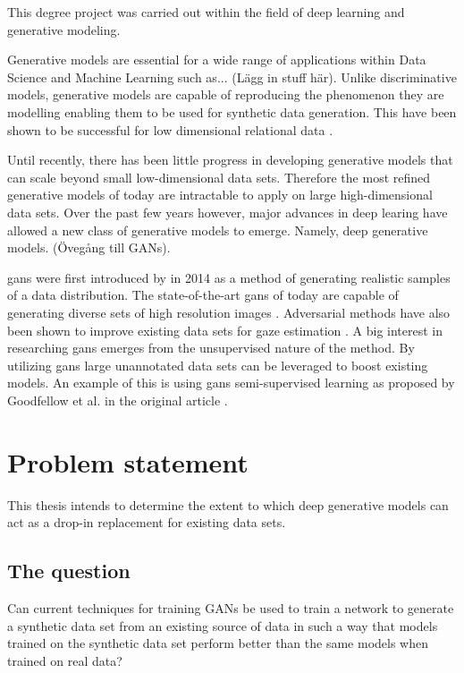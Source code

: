
This degree project was carried out within the field of deep learning and generative modeling.

Generative models are essential for a wide range of applications within Data Science and Machine Learning such as... (Lägg in stuff här). Unlike discriminative models, generative models are capable of reproducing the phenomenon they are modelling enabling them to be used for synthetic data generation. This have been shown to be successful for low dimensional relational data \cite{patki2016synthetic}. 

Until recently, there has been little progress in developing generative models that can scale beyond small low-dimensional data sets. Therefore the most refined generative models of today are intractable to apply on large high-dimensional data sets. Over the past few years however, major advances in deep learing have allowed a new class of generative models to emerge. Namely, deep generative models. (Övegång till GANs).


\acrlong{gans} were first introduced by \textcite{goodfellow2014generative} in 2014 as a method of generating realistic samples of a data distribution. The state-of-the-art \acrshort{gans} of today are capable of generating diverse sets of high resolution images \cite{karras2017progressive}. Adversarial methods have also been shown to improve existing data sets for gaze estimation \cite{shrivastava2016learning}. A big interest in researching \acrshort{gans} emerges from the unsupervised nature of the method. By utilizing \acrshort{gans} large unannotated data sets can be leveraged to boost existing models. An example of this is using \acrshort{gans} semi-supervised learning as proposed by Goodfellow et al. in the original article \cite{goodfellow2014generative}.




\section{Problem statement}
This thesis intends to determine the extent to which deep generative models can act as a drop-in replacement for existing data sets. 

\subsection{The question}
Can current techniques for training GANs be used to train a network to generate a synthetic data set from
an existing source of data in such a way that models trained on the synthetic
data set perform better than the same models when trained on real data?

